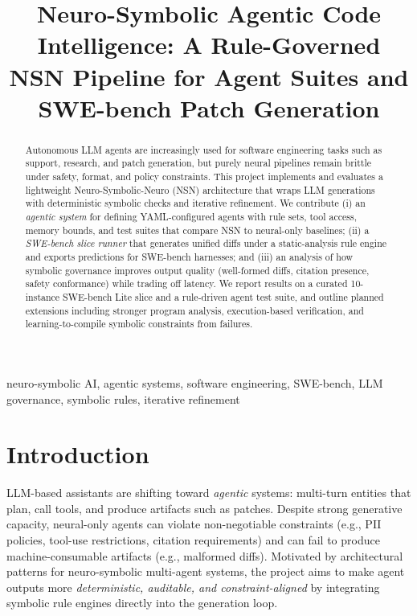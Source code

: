 \documentclass[conference]{IEEEtran}
\title{Neuro-Symbolic Agentic Code Intelligence: A Rule-Governed NSN Pipeline for Agent Suites and SWE-bench Patch Generation%
}
\author{
\IEEEauthorblockN{Adithya Kishor}
\IEEEauthorblockA{Extra Project \\
Roll Num: \texttt{2023111019} \\
Project repository: \url{https://gitfront.io/r/afoolishman/rPbsa8yXe8Tm/se-symbolic-ai-work/} }
}
\begin{document}
\maketitle

\begin{abstract}
Autonomous LLM agents are increasingly used for software engineering tasks such as support, research, and patch generation, but purely neural pipelines remain brittle under safety, format, and policy constraints. This project implements and evaluates a lightweight Neuro-Symbolic-Neuro (NSN) architecture that wraps LLM generations with deterministic symbolic checks and iterative refinement. We contribute (i) an \emph{agentic system} for defining YAML-configured agents with rule sets, tool access, memory bounds, and test suites that compare NSN to neural-only baselines; (ii) a \emph{SWE-bench slice runner} that generates unified diffs under a static-analysis rule engine and exports predictions for SWE-bench harnesses; and (iii) an analysis of how symbolic governance improves output quality (well-formed diffs, citation presence, safety conformance) while trading off latency. We report results on a curated 10-instance SWE-bench Lite slice and a rule-driven agent test suite, and outline planned extensions including stronger program analysis, execution-based verification, and learning-to-compile symbolic constraints from failures.
\end{abstract}

\begin{IEEEkeywords}
neuro-symbolic AI, agentic systems, software engineering, SWE-bench, LLM governance, symbolic rules, iterative refinement
\end{IEEEkeywords}

\section{Introduction}
LLM-based assistants are shifting toward \emph{agentic} systems: multi-turn entities that plan, call tools, and produce artifacts such as patches. Despite strong generative capacity, neural-only agents can violate non-negotiable constraints (e.g., PII policies, tool-use restrictions, citation requirements) and can fail to produce machine-consumable artifacts (e.g., malformed diffs). Motivated by architectural patterns for neuro-symbolic multi-agent systems, the project aims to make agent outputs more \emph{deterministic, auditable, and constraint-aligned} by integrating symbolic rule engines directly into the generation loop.
\end{document}
